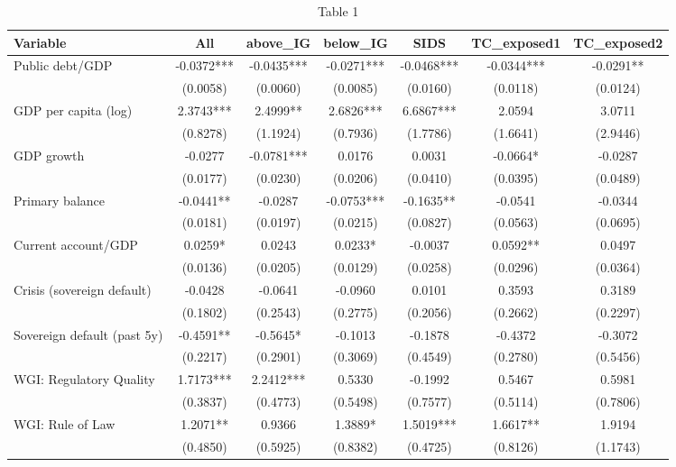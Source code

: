 \documentclass[10pt]{article}
\begin{document}
\thispagestyle{empty}
\begin{table}[h!]
  \centering
  \scriptsize
  \caption{Table 1}
  \label{rating-table-yearFE-avgscore}
  \begin{threeparttable}
  \begin{tabular}{lcccccc}
    \toprule
    Variable & All & above\_IG & below\_IG & SIDS & TC\_exposed1 & TC\_exposed2 \\
    \midrule
    Public debt/GDP & -0.0372*** & -0.0435*** & -0.0271*** & -0.0468*** & -0.0344*** & -0.0291** \\
     & (0.0058) & (0.0060) & (0.0085) & (0.0160) & (0.0118) & (0.0124) \\[2pt]
    GDP per capita (log) & 2.3743*** & 2.4999** & 2.6826*** & 6.6867*** & 2.0594 & 3.0711 \\
     & (0.8278) & (1.1924) & (0.7936) & (1.7786) & (1.6641) & (2.9446) \\[2pt]
    GDP growth & -0.0277 & -0.0781*** & 0.0176 & 0.0031 & -0.0664* & -0.0287 \\
     & (0.0177) & (0.0230) & (0.0206) & (0.0410) & (0.0395) & (0.0489) \\[2pt]
    Primary balance & -0.0441** & -0.0287 & -0.0753*** & -0.1635** & -0.0541 & -0.0344 \\
     & (0.0181) & (0.0197) & (0.0215) & (0.0827) & (0.0563) & (0.0695) \\[2pt]
    Current account/GDP & 0.0259* & 0.0243 & 0.0233* & -0.0037 & 0.0592** & 0.0497 \\
     & (0.0136) & (0.0205) & (0.0129) & (0.0258) & (0.0296) & (0.0364) \\[2pt]
    Crisis (sovereign default) & -0.0428 & -0.0641 & -0.0960 & 0.0101 & 0.3593 & 0.3189 \\
     & (0.1802) & (0.2543) & (0.2775) & (0.2056) & (0.2662) & (0.2297) \\[2pt]
    Sovereign default (past 5y) & -0.4591** & -0.5645* & -0.1013 & -0.1878 & -0.4372 & -0.3072 \\
     & (0.2217) & (0.2901) & (0.3069) & (0.4549) & (0.2780) & (0.5456) \\[2pt]
    WGI: Regulatory Quality & 1.7173*** & 2.2412*** & 0.5330 & -0.1992 & 0.5467 & 0.5981 \\
     & (0.3837) & (0.4773) & (0.5498) & (0.7577) & (0.5114) & (0.7806) \\[2pt]
    WGI: Rule of Law & 1.2071** & 0.9366 & 1.3889* & 1.5019*** & 1.6617** & 1.9194 \\
     & (0.4850) & (0.5925) & (0.8382) & (0.4725) & (0.8126) & (1.1743) \\[2pt]

\end{tabular}
\end{threeparttable}
\end{table}
\end{document}
